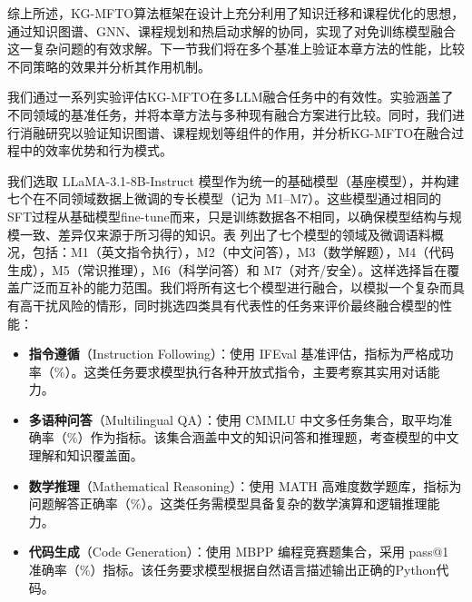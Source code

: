 \documentclass[../main.tex]{subfiles}
\begin{document}
综上所述，KG-MFTO算法框架在设计上充分利用了知识迁移和课程优化的思想，通过知识图谱、GNN、课程规划和热启动求解的协同，实现了对免训练模型融合这一复杂问题的有效求解。下一节我们将在多个基准上验证本章方法的性能，比较不同策略的效果并分析其作用机制。

\label{sec:ch5-6-experiments-and-analysis}

我们通过一系列实验评估KG-MFTO在多LLM融合任务中的有效性。实验涵盖了不同领域的基准任务，并将本章方法与多种现有融合方案进行比较。同时，我们进行消融研究以验证知识图谱、课程规划等组件的作用，并分析KG-MFTO在融合过程中的效率优势和行为模式。

\label{sec:ch5-6-1-experimental-setup}


我们选取 LLaMA-3.1-8B-Instruct 模型作为统一的基础模型（基座模型），并构建七个在不同领域数据上微调的专长模型（记为 M1--M7）。这些模型通过相同的SFT过程从基础模型fine-tune而来，只是训练数据各不相同，以确保模型结构与规模一致、差异仅来源于所习得的知识。表 列出了七个模型的领域及微调语料概况，包括：M1（英文指令执行），M2（中文问答），M3（数学解题），M4（代码生成），M5（常识推理），M6（科学问答）和 M7（对齐/安全）。这样选择旨在覆盖广泛而互补的能力范围。我们将所有这七个模型进行融合，以模拟一个复杂而具有高干扰风险的情形，同时挑选四类具有代表性的任务来评价最终融合模型的性能：

\begin{itemize}[leftmargin=3\ccwd]
\item \textbf{指令遵循}（Instruction Following）：使用 IFEval 基准评估\cite{ifeval_zhou_2023}，指标为严格成功率（\%）。这类任务要求模型执行各种开放式指令，主要考察其实用对话能力。
\item \textbf{多语种问答}（Multilingual QA）：使用 CMMLU 中文多任务集合\cite{li2023cmmlu}，取平均准确率（\%）作为指标。该集合涵盖中文的知识问答和推理题，考查模型的中文理解和知识覆盖面。
\item \textbf{数学推理}（Mathematical Reasoning）：使用 MATH 高难度数学题库\cite{hendrycks2021math}，指标为问题解答正确率（\%）。这类任务需模型具备复杂的数学演算和逻辑推理能力。
\item \textbf{代码生成}（Code Generation）：使用 MBPP 编程竞赛题集合\cite{austin2021mbpp}，采用 pass@1 准确率（\%）指标。该任务要求模型根据自然语言描述输出正确的Python代码。
\end{itemize}
\end{document}
